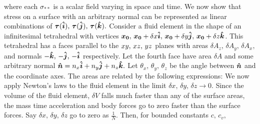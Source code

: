 where each $\sigma_{**}$ is a scalar field varying in space and time. We now show that stress on a surface with an arbitrary normal can be represented as linear combinations of $\boldsymbol{\tau}(\boldsymbol{\hat{i}}),\, \boldsymbol{\tau}(\boldsymbol{\hat{j}}),\, \boldsymbol{\tau}(\boldsymbol{\hat{k}}).$ Consider a fluid element in the shape of an infinitesimal tetrahedral with vertices $\boldsymbol{x_0},\,\boldsymbol{x_0}+\delta x\boldsymbol{\hat{i}},\,\boldsymbol{x_0}+\delta y\boldsymbol{\hat{j}},\,\boldsymbol{x_0}+\delta z\boldsymbol{\hat{k}}$. This tetrahedral has a faces parallel to the $x\-y,\,x\-z,\,y\-z$ planes with areas $\delta A_z,\,\delta A_y,\,\delta A_x,$ and normals $-\boldsymbol{\hat{k}},\,-\boldsymbol{\hat{j}},\,-\boldsymbol{\hat{i}}$ respectively. Let the fourth face have area $\delta A$ and some arbitrary normal $\boldsymbol{\hat{n}}=n_x\boldsymbol{\hat{i}}+n_y\boldsymbol{\hat{j}}+n_z\boldsymbol{\hat{k}}.$ Let $\theta_x,\,\theta_y,\,\theta_z$ be the angle between $\boldsymbol{\hat{n}}$ and the coordinate axes. The areas are related by the following expressions:
We now apply Newton's laws to the fluid element in the limit $\delta x,\,\delta y,\,\delta z\rightarrow0.$ Since the volume of the fluid element, $\delta V$ falls much faster than any of the surface areas, the mass time acceleration and body forces go to zero faster than the surface forces.
Say $\delta x,\,\delta y,\,\delta z$ go to zero as $\frac{1}{N}.$ Then, for bounded constants $c,\,c_v,$
